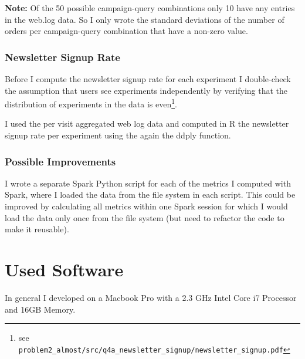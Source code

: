 \documentclass{article}\usepackage[]{graphicx}\usepackage[]{color}
\begin{document}
\textbf{Note:} Of the 50 possible campaign-query combinations only 10 have any entries in the web.log data. So I only wrote the standard deviations of the number of orders per campaign-query combination that have a non-zero value. 


\subsubsection{Newsletter Signup Rate} %
\label{subsub:signup}

Before I compute the newsletter signup rate for each experiment I double-check the assumption that users see experiments independently by verifying that the distribution of experiments in the data is even\footnote{see \verb+problem2_almost/src/q4a_newsletter_signup/newsletter_signup.pdf+}.

I used the per visit aggregated web log data and computed in R the newsletter signup rate per experiment using the again the ddply function.



\subsubsection{Possible Improvements} %
\label{subsub:improvements}

I wrote a separate Spark Python script for each of the metrics I computed with Spark, where I loaded the data from the file system in each script. This could be improved by calculating all metrics within one Spark session for which I would load the data only once from the file system (but need to refactor the code to make it reusable). 




\section{Used Software}
\label{used_software}
In general I developed on a Macbook Pro with a 2.3 GHz Intel Core i7 Processor and 16GB Memory.
\end{document}
